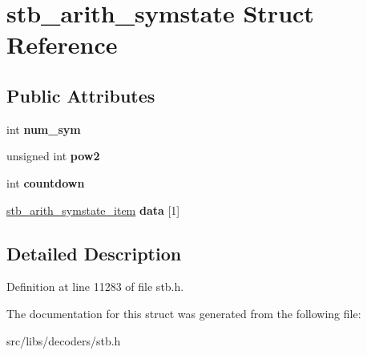 \hypertarget{structstb__arith__symstate}{\section{stb\-\_\-arith\-\_\-symstate Struct Reference}
\label{structstb__arith__symstate}
}
\subsection*{Public Attributes}
\begin{DoxyCompactItemize}
\item 
\hypertarget{structstb__arith__symstate_ae4cdee63ead8655c41e27992ff305aac}{int {\bfseries num\-\_\-sym}}\label{structstb__arith__symstate_ae4cdee63ead8655c41e27992ff305aac}

\item 
\hypertarget{structstb__arith__symstate_a5d54ce9b3871b3b0defb2e7ffb5e9542}{unsigned int {\bfseries pow2}}\label{structstb__arith__symstate_a5d54ce9b3871b3b0defb2e7ffb5e9542}

\item 
\hypertarget{structstb__arith__symstate_ad7a85aeee41996a2d44a7cc42f96005f}{int {\bfseries countdown}}\label{structstb__arith__symstate_ad7a85aeee41996a2d44a7cc42f96005f}

\item 
\hypertarget{structstb__arith__symstate_a0568e4c385330503f5a5573ac2fb006b}{\hyperlink{structstb__arith__symstate__item}{stb\-\_\-arith\-\_\-symstate\-\_\-item} {\bfseries data} \mbox{[}1\mbox{]}}\label{structstb__arith__symstate_a0568e4c385330503f5a5573ac2fb006b}

\end{DoxyCompactItemize}


\subsection{Detailed Description}


Definition at line 11283 of file stb.\-h.



The documentation for this struct was generated from the following file\-:\begin{DoxyCompactItemize}
\item 
src/libs/decoders/stb.\-h\end{DoxyCompactItemize}
